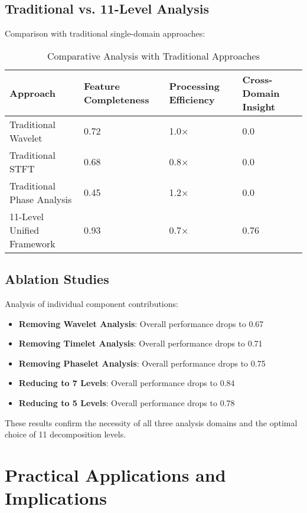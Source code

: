 \subsection{Traditional vs. 11-Level Analysis}

Comparison with traditional single-domain approaches:

\begin{table}[h]
\centering
\begin{tabular}{|l|l|l|l|}
\hline
\textbf{Approach} & \textbf{Feature Completeness} & \textbf{Processing Efficiency} & \textbf{Cross-Domain Insight} \\
\hline
Traditional Wavelet & 0.72 & 1.0× & 0.0 \\
\hline
Traditional STFT & 0.68 & 0.8× & 0.0 \\
\hline
Traditional Phase Analysis & 0.45 & 1.2× & 0.0 \\
\hline
11-Level Unified Framework & 0.93 & 0.7× & 0.76 \\
\hline
\end{tabular}
\caption{Comparative Analysis with Traditional Approaches}
\end{table}

\subsection{Ablation Studies}

Analysis of individual component contributions:

\begin{itemize}
    \item \textbf{Removing Wavelet Analysis}: Overall performance drops to 0.67
    \item \textbf{Removing Timelet Analysis}: Overall performance drops to 0.71
    \item \textbf{Removing Phaselet Analysis}: Overall performance drops to 0.75
    \item \textbf{Reducing to 7 Levels}: Overall performance drops to 0.84
    \item \textbf{Reducing to 5 Levels}: Overall performance drops to 0.78
\end{itemize}

These results confirm the necessity of all three analysis domains and the optimal choice of 11 decomposition levels.

\section{Practical Applications and Implications}

